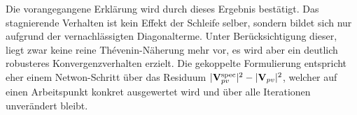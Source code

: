 
Die vorangegangene Erklärung wird durch dieses Ergebnis bestätigt.
Das stagnierende Verhalten ist kein Effekt der Schleife selber, sondern bildet sich nur aufgrund der vernachlässigten Diagonalterme.
Unter Berücksichtigung dieser, liegt zwar keine reine Thévenin-Näherung mehr vor, es wird aber ein deutlich robusteres Konvergenzverhalten erzielt.
Die gekoppelte Formulierung entspricht eher einem Netwon-Schritt über das Residuum $|\mathbf{V}^{\mathrm{spec}}_{pv}|^2 - |\mathbf{V}_{pv}|^2$, welcher auf einen Arbeitspunkt konkret ausgewertet wird und über alle Iterationen unverändert bleibt.\\



%



